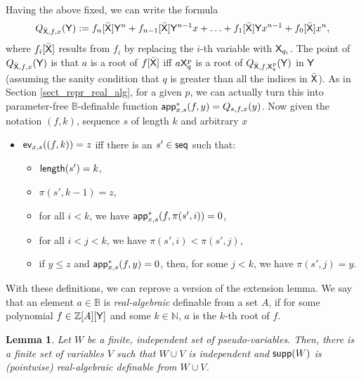 \documentclass{amsart}
\renewcommand{\leq}{\leqslant}
\newtheorem{lem}[theorem]{Lemma}
\newcommand{\bleq}{\mathbin{\leq}}
\newcommand{\X}{{\sf X}}
\newcommand{\Y}{{\sf Y}}
\newcommand{\psvar}{pseudo-variables}
\begin{document}
Having the above fixed, we can write the formula
\[Q_{\bar{\X},f,x}(\Y) := f_n[\bar{\X}] \Y^n + f_{n-1}[\bar{\X}]\Y^{n-1}x + \ldots + f_1[\bar{\X}]\Y x^{n-1} + f_0[\bar{\X}]x^{n},\]
where $f_i[\bar{\X}]$ results from $f_i$ by replacing the $i$-th variable with $\X_{q_i}$. The point of $Q_{\bar{\X},f,x}(\Y)$ is that $a$ is a root of $f[\bar{\X}]$ iff $a\X_q^{p}$ is a root of $Q_{\bar{\X}, f,\X_q^p}(\Y)$ in $\Y$ (assuming the sanity condition that $q$ is greater than all the indices in $\bar{\X}$). As in Section \ref{sect_repr_real_alg}, for a given $p$, we can actually turn this into parameter-free $\mathbb{B}$-definable function 
${\sf app}^*_{x,s}(f,y) = Q_{s,f,x}(y)$.
Now given the notation $(f,k)$, sequence $s$ of length $k$ and arbitrary $x$

\begin{itemize}
    \item 
    ${\sf ev}_{x,s}((f,k)) = z$ iff there is an $s'\in {\sf seq}$ such that:
    \begin{itemize}
    \item
    ${\sf length}(s')=k$,
        \item 
    $\pi(s',k-1) = z$,
    \item 
    for all $i<k$, we have ${\sf app}^*_{x,s}(f,\pi(s',i)) =0 $,
    \item
    for all $i<j<k$, we have $\pi(s',i) < \pi(s',j)$,
    \item 
    if $y \bleq z$ and 
    ${\sf app}^*_{x,s}(f,y) =0$, then, for some  $j<k$, we have $\pi(s',j)= y$.
    \end{itemize}
\end{itemize}
With these definitions, we can reprove a version of the extension lemma. We say that an element $a\in\mathbb{B}$ is \textit{real-algebraic} definable from a set $A$, if for some polynomial $f\in\mathbb{Z}[A][\Y]$ and some $k\in\mathbb{N}$, $a$ is the $k$-th root of $f$. 


\begin{lem}\label{spelendesmurfIOPEN}
Let $W$ be a finite, independent set of \psvar. Then, there is a finite set of variables $V$ such 
that $W\cup V$ is independent and ${\sf supp}(W)$ is \textup(pointwise\textup) 
real-algebraic definable from $W\cup V$.
 \end{lem}
\end{document}
